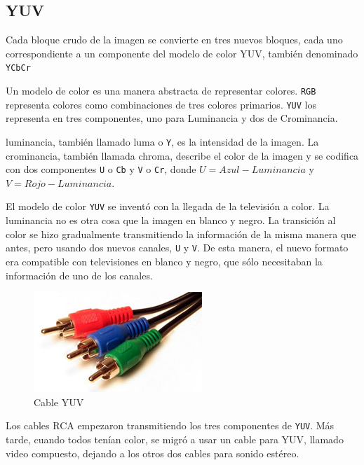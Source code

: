 \subsection{YUV}\label{sub:yuv}

Cada bloque crudo de la imagen se convierte en tres nuevos bloques, cada uno
correspondiente a un componente del modelo de color \gls{YUV}, también
denominado \verb+YCbCr+

Un modelo de color es una manera abstracta de representar colores. \verb+RGB+
representa colores como combinaciones de tres colores primarios. \verb+YUV+ los
representa en tres componentes, uno para Luminancia y dos de Crominancia.

\gls{luminancia}, también llamado luma o \verb+Y+, es la intensidad de la imagen. La
\gls{crominancia}, también llamada chroma, describe el color de la imagen y se
codifica con dos componentes \verb+U+ o \verb+Cb+ y \verb+V+ o \verb+Cr+, donde
$U = Azul - Luminancia$ y $V = Rojo - Luminancia$.

El modelo de color \verb+YUV+ se inventó con la llegada de la televisión a
color. La luminancia no es otra cosa que la imagen en blanco y negro. La
transición al color se hizo gradualmente transmitiendo la información de la
misma manera que antes, pero usando dos nuevos canales, \verb+U+ y \verb+V+. De
esta manera, el nuevo formato era compatible con televisiones en blanco y
negro, que sólo necesitaban la información de uno de los canales.

\begin{figure}[hb]
\includegraphics{yuv_cable}
    \caption{Cable YUV}
\end{figure}

Los cables RCA empezaron transmitiendo los tres componentes de \verb+YUV+. Más
tarde, cuando todos tenían color, se migró a usar un cable para \gls{YUV},
llamado video compuesto, dejando a los otros dos cables para sonido estéreo.

